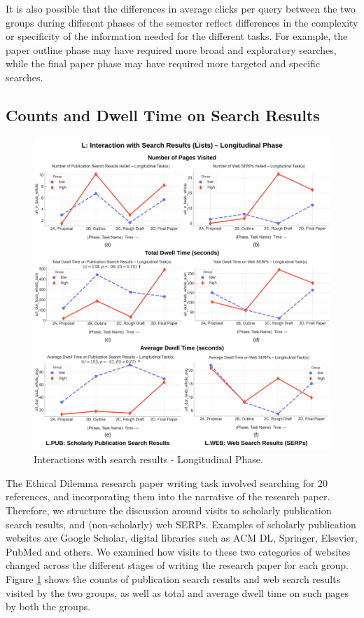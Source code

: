 \documentclass[letterpaper, nobind]{templates/ociamthesis}
\begin{document}
It is also possible that the differences in average clicks per query between the two groups during different phases of the semester reflect differences in the complexity or specificity of the information needed for the different tasks. For example, the paper outline phase may have required more broad and exploratory searches, while the final paper phase may have required more targeted and specific searches.

\hypertarget{sec-phase2-res-L-dt}{%
\subsection{Counts and Dwell Time on Search Results}\label{sec-phase2-res-L-dt}}

\begin{figure}

{\centering \includegraphics[width=1\linewidth]{figs/rp2-l} 

}

\caption[Interactions with search results - Longitudinal Phase.]{Interactions with search results - Longitudinal Phase.}\label{fig:rp2-l}
\end{figure}





The Ethical Dilemma research paper writing task involved searching for 20 references, and incorporating them into the narrative of the research paper.
Therefore, we structure the discussion around visits to scholarly publication search results, and (non-scholarly) web SERPs.
Examples of scholarly publication websites are Google Scholar, digital libraries such as ACM DL, Springer, Elsevier, PubMed and others.
We examined how visits to these two categories of websites changed across the different stages of writing the research paper for each group.
Figure \ref{fig:rp2-l} shows the counts of publication search results and web search results visited by the two groups, as well as total and average dwell time on such pages by both the groups.
\end{document}
